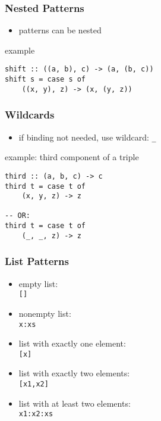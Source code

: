 \documentclass[dvipsnames]{beamer}
\theoremstyle{plain}
\begin{document}
\begin{frame}[fragile]
  \frametitle{Nested Patterns}

  \begin{itemize}
    \item patterns can be nested
  \end{itemize}

  \begin{exampleblock}{example}
    \begin{lstlisting}
shift :: ((a, b), c) -> (a, (b, c))
shift s = case s of
    ((x, y), z) -> (x, (y, z))
    \end{lstlisting}
  \end{exampleblock}
\end{frame}

\begin{frame}[fragile]
  \frametitle{Wildcards}

  \begin{itemize}
    \item if binding not needed, use wildcard: \lstinline|_|
  \end{itemize}

  \begin{exampleblock}{example: third component of a triple}
    \begin{lstlisting}
third :: (a, b, c) -> c
third t = case t of
    (x, y, z) -> z

-- OR:
third t = case t of
    (_, _, z) -> z
    \end{lstlisting}
  \end{exampleblock}
\end{frame}

\begin{frame}[fragile]
  \frametitle{List Patterns}

  \begin{itemize}
    \item empty list:\\
      \lstinline|[]|
    \item nonempty list:\\
      \lstinline|x:xs|
    \item list with exactly one element:\\
      \lstinline|[x]|
    \item list with exactly two elements:\\
      \lstinline|[x1,x2]|
    \item list with at least two elements:\\
      \lstinline|x1:x2:xs|
  \end{itemize}
\end{frame}
\end{document}
